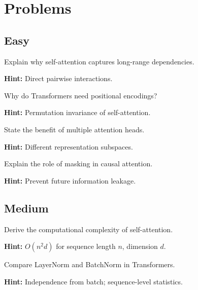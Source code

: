 
\section*{Problems}

\subsection*{Easy}

\begin{problem}
Explain why self-attention captures long-range dependencies.

\textbf{Hint:} Direct pairwise interactions.
\end{problem}

\begin{problem}
Why do Transformers need positional encodings?

\textbf{Hint:} Permutation invariance of self-attention.
\end{problem}

\begin{problem}
State the benefit of multiple attention heads.

\textbf{Hint:} Different representation subspaces.
\end{problem}

\begin{problem}
Explain the role of masking in causal attention.

\textbf{Hint:} Prevent future information leakage.
\end{problem}

\subsection*{Medium}

\begin{problem}
Derive the computational complexity of self-attention.

\textbf{Hint:} $O(n^2 d)$ for sequence length $n$, dimension $d$.
\end{problem}

\begin{problem}
Compare LayerNorm and BatchNorm in Transformers.

\textbf{Hint:} Independence from batch; sequence-level statistics.
\end{problem}

